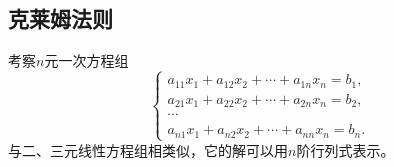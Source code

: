 \documentclass[10pt,a4paper%
tablecaptionabove]{article}
\newcommand{\cd}{\cdots}
\begin{document}
\begin{CJK}{UTF8}{gkai}
\section{克莱姆法则}
考察$n$元一次方程组
\begin{equation}\label{ls}
  \left\{
    \begin{array}{l}
      a_{11}x_1 + a_{12}x_2 + \cdots + a_{1n}x_n = b_1, \\[0.3cm]
      a_{21}x_1 + a_{22}x_2 + \cdots + a_{2n}x_n = b_2, \\[0.3cm]
      \cd \\[0.2cm]
      a_{n1}x_1 + a_{n2}x_2 + \cdots + a_{nn}x_n = b_n.
    \end{array}
  \right.
\end{equation}
与二、三元线性方程组相类似，它的解可以用$n$阶行列式表示。


\end{CJK}
\end{document}
